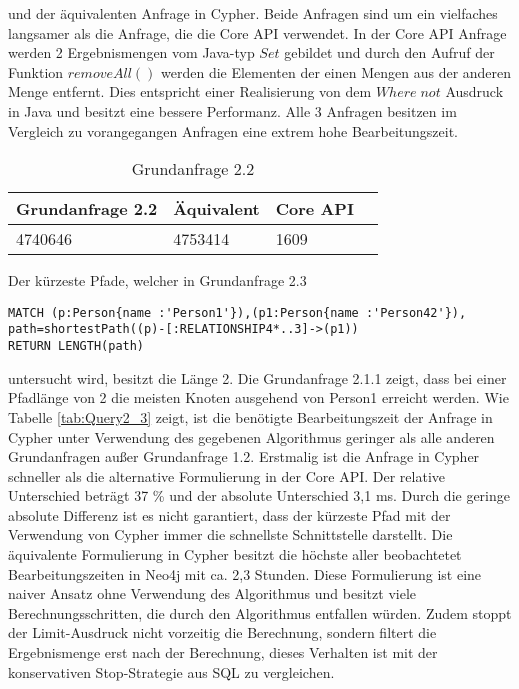  und der äquivalenten Anfrage in Cypher. Beide Anfragen sind um ein vielfaches langsamer als die Anfrage, die die Core API verwendet. In der Core API Anfrage werden 2 Ergebnismengen vom Java-typ $Set$ gebildet und durch den Aufruf der Funktion $removeAll()$  werden die Elementen der einen Mengen aus der anderen Menge entfernt. Dies entspricht einer Realisierung von dem $Where\;not$ Ausdruck  in Java und besitzt eine bessere Performanz. Alle 3 Anfragen besitzen im Vergleich zu vorangegangen Anfragen eine extrem hohe Bearbeitungszeit.
\FloatBarrier
\begin{table}[h]
	\centering
		\begin{tabular}{ |p{3cm}|p{3cm}|p{3cm}|p{3cm}|  }
			\hline
			Grundanfrage 2.2 & Äquivalent&Core API\\
			\hline
			4740646    & 4753414 &  1609\\
			\hline
		\end{tabular}
		\caption{Grundanfrage 2.2}
		\label{tab:Query2_2}
\end{table}
\FloatBarrier
\noindent Der kürzeste Pfade, welcher in Grundanfrage 2.3
\begin{Verbatim}[frame=single]
MATCH (p:Person{name :'Person1'}),(p1:Person{name :'Person42'}),
path=shortestPath((p)-[:RELATIONSHIP4*..3]->(p1)) 
RETURN LENGTH(path)
\end{Verbatim} 
 untersucht wird, besitzt die Länge 2. Die Grundanfrage 2.1.1 zeigt, dass bei einer Pfadlänge von 2 die meisten Knoten ausgehend von Person1 erreicht werden. Wie Tabelle \ref{tab:Query2_3} zeigt, ist die benötigte Bearbeitungszeit der Anfrage in Cypher unter Verwendung des gegebenen Algorithmus geringer als alle anderen Grundanfragen außer Grundanfrage 1.2. Erstmalig ist die Anfrage in Cypher schneller als die alternative Formulierung in der Core API. Der relative Unterschied beträgt 37 \% und  der absolute Unterschied 3,1 ms. Durch die geringe absolute Differenz ist es nicht garantiert, dass der kürzeste Pfad mit der Verwendung von Cypher immer die schnellste Schnittstelle darstellt. \newline
Die äquivalente Formulierung in Cypher besitzt die höchste aller beobachtetet Bearbeitungszeiten in Neo4j mit ca. 2,3 Stunden. Diese Formulierung ist eine naiver Ansatz ohne Verwendung des Algorithmus und besitzt viele Berechnungsschritten, die durch den Algorithmus entfallen würden. Zudem stoppt der Limit-Ausdruck nicht vorzeitig die Berechnung, sondern filtert die Ergebnismenge erst nach der Berechnung, dieses Verhalten ist mit der konservativen Stop-Strategie aus SQL zu vergleichen\parencite{carey1997saying}.   
